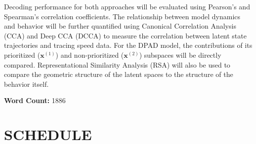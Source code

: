\documentclass[12pt, letterpaper]{article}
\begin{document}
Decoding performance for both approaches will be evaluated using Pearson's and Spearman’s correlation coefficients. The relationship between model dynamics and behavior will be further quantified using Canonical Correlation Analysis (CCA) and Deep CCA (DCCA) to measure the correlation between latent state trajectories and tracing speed data. For the DPAD model, the contributions of its prioritized ($\mathbf{x}^{(1)}$) and non-prioritized ($\mathbf{x}^{(2)}$) subspaces will be directly compared. Representational Similarity Analysis (RSA) will also be used to compare the geometric structure of the latent spaces to the structure of the behavior itself.

\vspace{1em}
\noindent\textbf{Word Count:} 1886
\newpage
\section{SCHEDULE}
\end{document}
